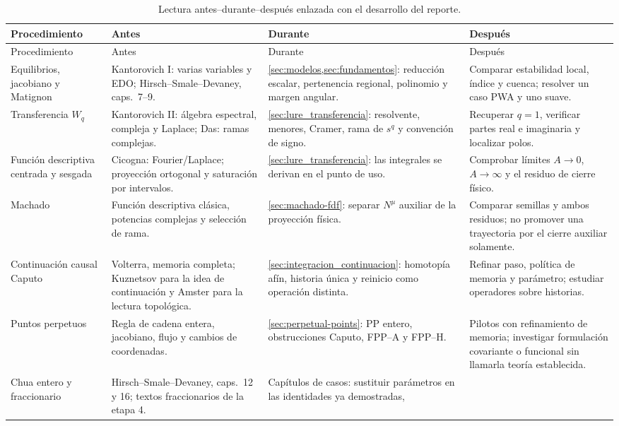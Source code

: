 \begin{longtable}{@{}L{3.1cm}L{4.0cm}L{4.1cm}L{3.0cm}@{}}
\caption{Lectura antes--durante--después enlazada con el desarrollo del reporte.}
\label{tab:lectura-procedimientos}\\
\toprule
Procedimiento & Antes & Durante & Después \\
\midrule
\endfirsthead
\toprule
Procedimiento & Antes & Durante & Después \\
\midrule
\endhead
Equilibrios, jacobiano y Matignon &
Kantorovich I: varias variables y EDO; Hirsch--Smale--Devaney, caps.\ 7--9. &
\cref{sec:modelos,sec:fundamentos}: reducción escalar, pertenencia regional,
polinomio y margen angular. &
Comparar estabilidad local, índice y cuenca; resolver un caso PWA y uno suave. \\
Transferencia \(W_q\) &
Kantorovich II: álgebra espectral, compleja y Laplace; Das: ramas complejas. &
\cref{sec:lure_transferencia}: resolvente, menores, Cramer, rama de \(s^q\) y
convención de signo. &
Recuperar \(q=1\), verificar partes real e imaginaria y localizar polos. \\
Función descriptiva centrada y sesgada &
Cicogna: Fourier/Laplace; proyección ortogonal y saturación por intervalos. &
\cref{sec:lure_transferencia}: las integrales se derivan en el punto de uso. &
Comprobar límites \(A\to0\), \(A\to\infty\) y el residuo de cierre físico. \\
Machado &
Función descriptiva clásica, potencias complejas y selección de rama. &
\cref{sec:machado-fdf}: separar \(N^\mu\) auxiliar de la proyección física. &
Comparar semillas y ambos residuos; no promover una trayectoria por el cierre
auxiliar solamente. \\
Continuación causal Caputo &
Volterra, memoria completa; Kuznetsov para la idea de continuación y Amster
para la lectura topológica. &
\cref{sec:integracion_continuacion}: homotopía afín, historia única y reinicio
como operación distinta. &
Refinar paso, política de memoria y parámetro; estudiar operadores sobre
historias. \\
Puntos perpetuos &
Regla de cadena entera, jacobiano, flujo y cambios de coordenadas. &
\cref{sec:perpetual-points}: PP entero, obstrucciones Caputo, FPP--A y FPP--H. &
Pilotos con refinamiento de memoria; investigar formulación covariante o
funcional sin llamarla teoría establecida. \\
Chua entero y fraccionario &
Hirsch--Smale--Devaney, caps.\ 12 y 16; textos fraccionarios de la etapa 4. &
Capítulos de casos: sustituir parámetros en las identidades ya demostradas,

\end{longtable}
